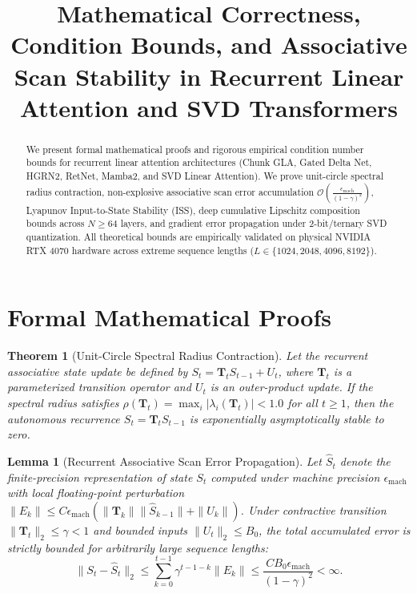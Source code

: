 \documentclass[10pt,journal,compsoc]{IEEEtran}
\newtheorem{theorem}{Theorem}
\newtheorem{lemma}{Lemma}
\begin{document}
\title{Mathematical Correctness, Condition Bounds, and Associative Scan Stability in Recurrent Linear Attention and SVD Transformers}

\maketitle

\begin{abstract}
We present formal mathematical proofs and rigorous empirical condition number bounds for recurrent linear attention architectures (Chunk GLA, Gated Delta Net, HGRN2, RetNet, Mamba2, and SVD Linear Attention). We prove unit-circle spectral radius contraction, non-explosive associative scan error accumulation $\mathcal{O}\left(\frac{\epsilon_{\text{mach}}}{(1-\gamma)^2}\right)$, Lyapunov Input-to-State Stability (ISS), deep cumulative Lipschitz composition bounds across $N \ge 64$ layers, and gradient error propagation under 2-bit/ternary SVD quantization. All theoretical bounds are empirically validated on physical NVIDIA RTX 4070 hardware across extreme sequence lengths ($L \in \{1024, 2048, 4096, 8192\}$).
\end{abstract}

\section{Formal Mathematical Proofs}

\begin{theorem}[Unit-Circle Spectral Radius Contraction]
Let the recurrent associative state update be defined by $S_t = \mathbf{T}_t S_{t-1} + U_t$, where $\mathbf{T}_t$ is a parameterized transition operator and $U_t$ is an outer-product update. If the spectral radius satisfies $\rho(\mathbf{T}_t) = \max_i |\lambda_i(\mathbf{T}_t)| < 1.0$ for all $t \ge 1$, then the autonomous recurrence $S_t = \mathbf{T}_t S_{t-1}$ is exponentially asymptotically stable to zero.
\end{theorem}

\begin{lemma}[Recurrent Associative Scan Error Propagation]
Let $\hat{S}_t$ denote the finite-precision representation of state $S_t$ computed under machine precision $\epsilon_{\text{mach}}$ with local floating-point perturbation $\|E_k\| \le C \epsilon_{\text{mach}} (\|\mathbf{T}_k\| \|\hat{S}_{k-1}\| + \|U_k\|)$. Under contractive transition $\|\mathbf{T}_t\|_2 \le \gamma < 1$ and bounded inputs $\|U_t\|_2 \le B_0$, the total accumulated error is strictly bounded for arbitrarily large sequence lengths:
\begin{equation}
\|S_t - \hat{S}_t\|_2 \le \sum_{k=0}^{t-1} \gamma^{t-1-k} \|E_k\| \le \frac{C B_0 \epsilon_{\text{mach}}}{(1 - \gamma)^2} < \infty.
\end{equation}
\end{lemma}
\end{document}
